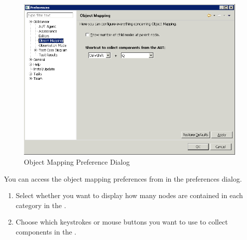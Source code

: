 

\begin{figure}[h]
\begin{center}
\includegraphics[width=12.5cm]{Tasks/Preferences/PS/objectmappingprefs}
\caption{Object Mapping Preference Dialog}
\label{objectmappingprefs}
\end{center}
\end{figure}

You can access the object mapping preferences from  in the preferences dialog. 
\begin{enumerate}
\item Select whether you want \app{} to display how many nodes are contained in each category in the \gdomeditor{}. 
\item Choose which keystrokes or mouse buttons you want to use to collect components in the \gdomm{}. 
\end{enumerate}


